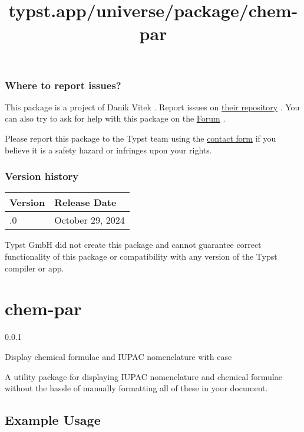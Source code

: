 \subsubsection{Where to report issues?}\label{where-to-report-issues}

This package is a project of Danik Vitek . Report issues on
\href{https://github.com/DanikVitek/typst-plugin-bigrational}{their
repository} . You can also try to ask for help with this package on the
\href{https://forum.typst.app}{Forum} .

Please report this package to the Typst team using the
\href{https://typst.app/contact}{contact form} if you believe it is a
safety hazard or infringes upon your rights.

\label{versions}
\subsubsection{Version history}\label{version-history}

\begin{longtable}[]{@{}ll@{}}
\toprule\noalign{}
Version & Release Date \\
\midrule\noalign{}
\endhead
\bottomrule\noalign{}
\endlastfoot
0.1.0 & October 29, 2024 \\
\end{longtable}

Typst GmbH did not create this package and cannot guarantee correct
functionality of this package or compatibility with any version of the
Typst compiler or app.


\title{typst.app/universe/package/chem-par}

\label{banner}
\section{chem-par}\label{chem-par}

{ 0.0.1 }

Display chemical formulae and IUPAC nomenclature with ease

\label{readme}
A utility package for displaying IUPAC nomenclature and chemical
formulae without the hassle of manually formatting all of these in your
document.

\subsection{Example Usage}\label{example-usage}

